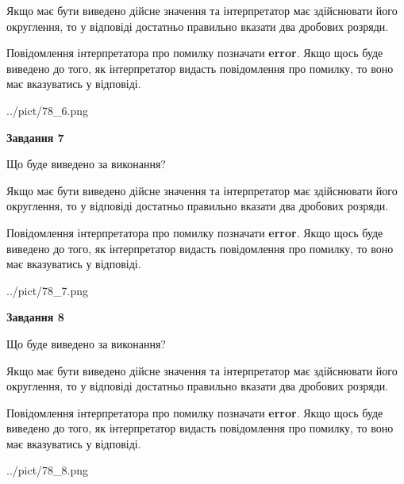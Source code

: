 \documentclass[12pt, ukrainian]{article}
\begin{document}
{\begin {Large}
Якщо має бути виведено дійсне значення та інтерпретатор має здійснювати його округлення, 
то у відповіді достатньо правильно вказати два дробових розряди.

Повідомлення інтерпретатора про помилку позначати \textbf{error}.
Якщо щось буде виведено до того, як інтерпретатор видасть повідомлення про помилку, 
то воно має вказуватись у відповіді. \par

\begin{center}
	{../pict/78_6.png}
\end{center}
\newpage

{\begin {center}\textbf{Завдання 7}\end {center}}\par
Що буде виведено за виконання? \par

Якщо має бути виведено дійсне значення та інтерпретатор має здійснювати його округлення, 
то у відповіді достатньо правильно вказати два дробових розряди.

Повідомлення інтерпретатора про помилку позначати \textbf{error}.
Якщо щось буде виведено до того, як інтерпретатор видасть повідомлення про помилку, 
то воно має вказуватись у відповіді. \par

\begin{center}
	{../pict/78_7.png}
\end{center}
\newpage

{\begin {center}\textbf{Завдання 8}\end {center}}\par
Що буде виведено за виконання? \par

Якщо має бути виведено дійсне значення та інтерпретатор має здійснювати його округлення, 
то у відповіді достатньо правильно вказати два дробових розряди.

Повідомлення інтерпретатора про помилку позначати \textbf{error}.
Якщо щось буде виведено до того, як інтерпретатор видасть повідомлення про помилку, 
то воно має вказуватись у відповіді. \par

\begin{center}
	{../pict/78_8.png}
\end{center}
\newpage


\end{Large}}
\end{document}
